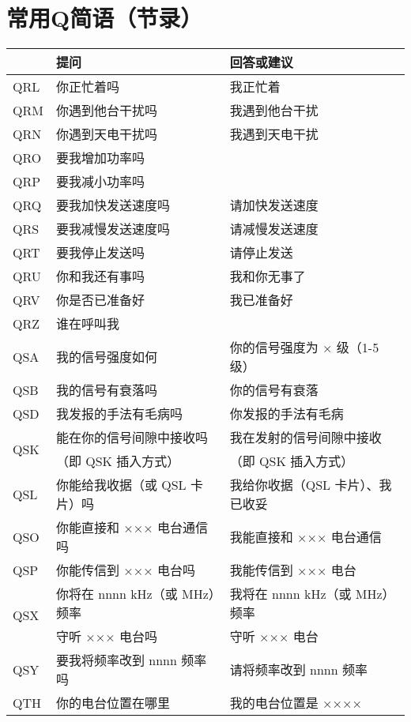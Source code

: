 \newpage

\section{常用Q简语（节录）}

\begin{longtable}{|l|l|l|}
	\hline
	 & \textbf{提问} & \textbf{回答或建议} \\
	\hline
	QRL & 你正忙着吗 & 我正忙着 \\
	\hline
	QRM & 你遇到他台干扰吗 & 我遇到他台干扰 \\
	\hline
	QRN & 你遇到天电干扰吗 & 我遇到天电干扰 \\
	\hline
	QRO & 要我增加功率吗 & \\
	\hline
	QRP & 要我减小功率吗 & \\
	\hline
	QRQ & 要我加快发送速度吗 & 请加快发送速度 \\
	\hline
	QRS & 要我减慢发送速度吗 & 请减慢发送速度 \\
	\hline
	QRT & 要我停止发送吗 & 请停止发送 \\
	\hline
	QRU & 你和我还有事吗 & 我和你无事了 \\
	\hline
	QRV & 你是否已准备好 & 我已准备好 \\
	\hline
	QRZ & 谁在呼叫我 & \\
	\hline
	QSA & 我的信号强度如何 & 你的信号强度为 × 级（1-5 级） \\
	\hline
	QSB & 我的信号有衰落吗 & 你的信号有衰落 \\
	\hline
	QSD & 我发报的手法有毛病吗 & 你发报的手法有毛病 \\
	\hline
	\multirow{2}{1em}{QSK} & 能在你的信号间隙中接收吗 & 我在发射的信号间隙中接收 \\
	& （即 QSK 插入方式）    & （即 QSK 插入方式） \\
	\hline
	QSL & 你能给我收据（或 QSL 卡片）吗 & 我给你收据（QSL 卡片）、我已收妥 \\
	\hline
	QSO & 你能直接和 ××× 电台通信吗 & 我能直接和 ××× 电台通信 \\
	\hline
	QSP & 你能传信到 ××× 电台吗 & 我能传信到 ××× 电台 \\
	\hline
	\multirow{2}{1em}{QSX} & 你将在 nnnn \si{\kHz}（或 \si{\MHz}）频率 & 我将在 nnnn \si{\kHz}（或 \si{\MHz}）频率 \\
	    & 守听 ××× 电台吗 & 守听 ××× 电台 \\
	\hline
	QSY & 要我将频率改到 nnnn 频率吗 & 请将频率改到 nnnn 频率 \\
	\hline
	QTH & 你的电台位置在哪里 & 我的电台位置是 ×××× \\
	\hline
\end{longtable}

